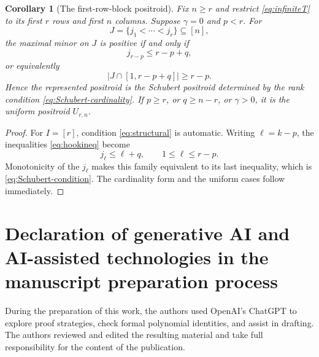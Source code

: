 \documentclass{amsart}
\numberwithin{equation}{section}
\newtheorem{corollary}[theorem]{Corollary}
\theoremstyle{definition}
\theoremstyle{remark}
\begin{document}
\begin{corollary}[The first-row-block positroid]\label{cor:Edrei-positroid}
Fix $n\ge r$ and restrict \eqref{eq:infiniteT} to its first $r$ rows and first $n$ columns.  Suppose $\gamma=0$ and $p<r$.  For
\[
 J=\{j_1<\cdots<j_r\}\subseteq[n],
\]
the maximal minor on $J$ is positive if and only if
\begin{equation}\label{eq:Schubert-condition}
 j_{r-p}\le r-p+q,
\end{equation}
or equivalently
\begin{equation}\label{eq:Schubert-cardinality}
 |J\cap[1,r-p+q]|\ge r-p.
\end{equation}
Hence the represented positroid is the Schubert positroid determined by the rank condition \eqref{eq:Schubert-cardinality}.  If $p\ge r$, or $q\ge n-r$, or $\gamma>0$, it is the uniform positroid $U_{r,n}$.
\end{corollary}

\begin{proof}
For $I=[r]$, condition \eqref{eq:structural} is automatic.  Writing $\ell=k-p$, the inequalities \eqref{eq:hookineq} become
\[
 j_\ell\le\ell+q,
 \qquad 1\le\ell\le r-p.
\]
Monotonicity of the $j_\ell$ makes this family equivalent to its last inequality, which is \eqref{eq:Schubert-condition}.  The cardinality form and the uniform cases follow immediately.
\end{proof}

\section*{Declaration of generative AI and AI-assisted technologies in the manuscript preparation process}

During the preparation of this work, the authors used OpenAI's ChatGPT to explore proof strategies, check formal polynomial identities, and assist in drafting.  The authors reviewed and edited the resulting material and take full responsibility for the content of the publication.
\end{document}
